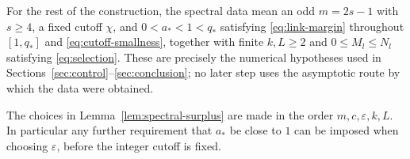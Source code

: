 For the rest of the construction, the spectral data mean an odd
\(m=2s-1\) with \(s\geq4\), a fixed cutoff \(\chi\), and
\(0<a_*<1<q_*\) satisfying \eqref{eq:link-margin} throughout
\([1,q_*]\) and \eqref{eq:cutoff-smallness}, together with finite
\(k,L\geq2\) and \(0\leq M_l\leq N_l\) satisfying
\eqref{eq:selection}. These are precisely the numerical hypotheses used
in Sections~\ref{sec:control}--\ref{sec:conclusion}; no later step uses
the asymptotic route by which the data were obtained.

The choices in Lemma~\ref{lem:spectral-surplus} are made in the order
$m,c,\varepsilon,k,L$. In particular any further requirement that $a_*$
be close to $1$ can be imposed when choosing $\varepsilon$, before the
integer cutoff is fixed.
